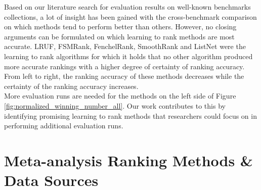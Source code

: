 \documentclass[english, authoryear, preprint]{elsarticle}
\begin{document}
Based on our literature search for evaluation results on well-known benchmarks collections, a lot of insight has been gained with the cross-benchmark comparison on which methods tend to perform better than others. However, no closing arguments can be formulated on which learning to rank methods are most accurate. LRUF, FSMRank, FenchelRank, SmoothRank and ListNet were the learning to rank algorithms for which it holds that no other algorithm produced more accurate rankings with a higher degree of certainty of ranking accuracy. From left to right, the ranking accuracy of these methods decreases while the certainty of the ranking accuracy increases.\\

More evaluation runs are needed for the methods on the left side of Figure \ref{fig:normalized_winning_number_all}. Our work contributes to this by identifying promising learning to rank methods that researchers could focus on in performing additional evaluation runs.



\newpage
\appendix
\section{Meta-analysis Ranking Methods \& Data Sources}
\end{document}
